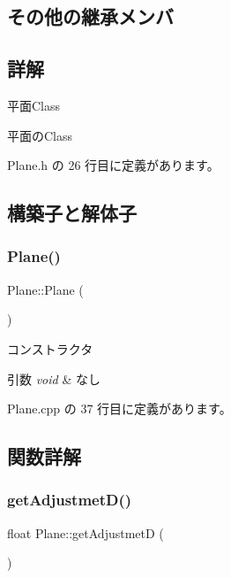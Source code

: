 \subsection*{その他の継承メンバ}


\subsection{詳解}
平面\+Class 

平面の\+Class 

 Plane.\+h の 26 行目に定義があります。



\subsection{構築子と解体子}
\mbox{\label{class_plane_acac0d9c003e0ab10d07b146c3566a0c7}} 
\subsubsection{\texorpdfstring{Plane()}{Plane()}}
{\footnotesize\ttfamily Plane\+::\+Plane (\begin{DoxyParamCaption}{ }\end{DoxyParamCaption})}



コンストラクタ 


\begin{DoxyParams}{引数}
{\em void} & なし \\
\hline
\end{DoxyParams}


 Plane.\+cpp の 37 行目に定義があります。



\subsection{関数詳解}
\mbox{\label{class_plane_a66c47e8798df166c458ca215ed115684}} 
\subsubsection{\texorpdfstring{get\+Adjustmet\+D()}{getAdjustmetD()}}
{\footnotesize\ttfamily float Plane\+::get\+AdjustmetD (\begin{DoxyParamCaption}{ }\end{DoxyParamCaption})}



